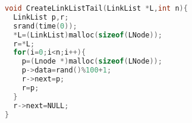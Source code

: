 \begin{lstlisting}[language=C,frame=tb,backgroundcolor=\color{red!10}]
void CreateLinkListTail(LinkList *L,int n){
  LinkList p,r;
  srand(time(0));
  *L=(LinkList)malloc(sizeof(LNode));
  r=*L;
  for(i=0;i<n;i++){
    p=(Lnode *)malloc(sizeof(LNode));
    p->data=rand()%100+1;
    r->next=p;
    r=p;
  }
  r->next=NULL;
}
\end{lstlisting}
